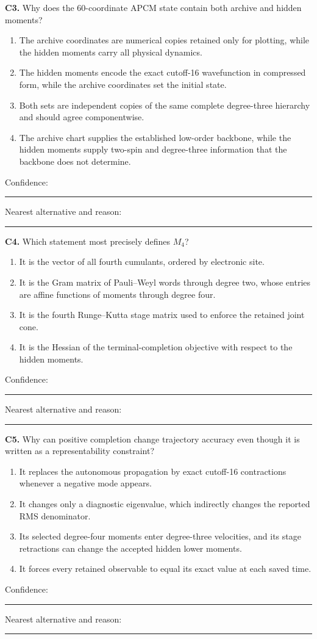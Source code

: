 \documentclass[11pt,letterpaper]{article}
\begin{document}
\textbf{C3.} Why does the 60-coordinate APCM state contain both archive and
hidden moments?

\begin{enumerate}[label=\Alph*.]
\item The archive coordinates are numerical copies retained only for plotting,
while the hidden moments carry all physical dynamics.
\item The hidden moments encode the exact cutoff-16 wavefunction in compressed
form, while the archive coordinates set the initial state.
\item Both sets are independent copies of the same complete degree-three
hierarchy and should agree componentwise.
\item The archive chart supplies the established low-order backbone, while the
hidden moments supply two-spin and degree-three information that the backbone
does not determine.
\end{enumerate}
Confidence: \rule{0.12\textwidth}{0.4pt}\quad
Nearest alternative and reason: \rule{0.40\textwidth}{0.4pt}

\textbf{C4.} Which statement most precisely defines $M_4$?

\begin{enumerate}[label=\Alph*.]
\item It is the vector of all fourth cumulants, ordered by electronic site.
\item It is the Gram matrix of Pauli--Weyl words through degree two, whose
entries are affine functions of moments through degree four.
\item It is the fourth Runge--Kutta stage matrix used to enforce the retained
joint cone.
\item It is the Hessian of the terminal-completion objective with respect to
the hidden moments.
\end{enumerate}
Confidence: \rule{0.12\textwidth}{0.4pt}\quad
Nearest alternative and reason: \rule{0.40\textwidth}{0.4pt}

\textbf{C5.} Why can positive completion change trajectory accuracy even
though it is written as a representability constraint?

\begin{enumerate}[label=\Alph*.]
\item It replaces the autonomous propagation by exact cutoff-16 contractions
whenever a negative mode appears.
\item It changes only a diagnostic eigenvalue, which indirectly changes the
reported RMS denominator.
\item Its selected degree-four moments enter degree-three velocities, and its
stage retractions can change the accepted hidden lower moments.
\item It forces every retained observable to equal its exact value at each
saved time.
\end{enumerate}
Confidence: \rule{0.12\textwidth}{0.4pt}\quad
Nearest alternative and reason: \rule{0.40\textwidth}{0.4pt}
\end{document}
